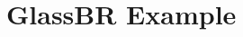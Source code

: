 \documentclass[usenames]{beamer}
\begin{document}
\begin{frame}

\end{frame}
\hoffset=0in 

\section[GlassBR Example]{GlassBR Example}

\end{document}

